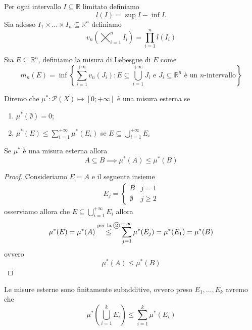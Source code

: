 \begin{definition}
	Per ogni intervallo $I \subseteq \mathbb{R}$ limitato definiamo
	$$
	\mathit{l}(I) = \sup{I} - \inf{I}.
	$$
	Sia adesso $I_1 \times \ldots \times I_n \subseteq \mathbb{R}^n$ definiamo
	$$
		v_n \left( \varprod_{i=1}^n I_i \right) = \prod_{i=1}^n \mathit{l}(I_i) 
	$$
\end{definition}
\begin{definition}
	Sia $E \subseteq \mathbb{R}^n$, definiamo la misura di Lebesgue di $E$ come
	\begin{equation}
		m_n(E) = \inf \left\{ \sum_{i=1}^{+\infty} v_n(J_i) : E \subseteq \bigcup_{i=1}^{+\infty} J_i \text{ e } J_i \subseteq \mathbb{R}^n \text{ è un } n\text{-intervallo} \right\}
		\label{eq:def_lebesgue}
	\end{equation}
\end{definition}
\begin{definition}
	Diremo che $\mu^*: \mathcal{P}(X) \mapsto [0; +\infty]$ è una misura esterna se
	\begin{enumerate}[label=\protect\circled{\arabic*}]
		\item $\mu^*(\emptyset) = 0$;
		\item $\mu^*(E) \leq \sum\limits_{i=1}^{+\infty} \mu^*(E_i)$ se $E \subseteq \bigcup\limits_{i=1}^{+\infty} E_i$
	\end{enumerate}
\end{definition}
\begin{prop}
	Se $\mu^*$ è una misura esterna allora
	$$
	A \subseteq B \implies \mu^*(A) \leq \mu^*(B)
	$$
	\label{prop:monotonia}
\end{prop}
\begin{proof}
	Consideriamo $E = A$ e il seguente insieme
	\begin{align*}
	E_j = \begin{cases} B & j=1 \\ \emptyset & j \geq 2	\end{cases}
	\end{align*}
	osserviamo allora che $E \subseteq \bigcup\limits_{i=1}^{+\infty} E_i$ allora
	$$
	\mu^*(E) = \mu^*(A) \stackrel{\text{per la \circled{2}}}{\leq} \sum_{j=1}^{+\infty} \mu^*(E_j) = \mu^*(E_1) = \mu^*(B)
	$$
	ovvero
	$$
	\mu^*(A) \leq \mu^*(B)
	$$
\end{proof}
\begin{prop}
	Le misure esterne sono finitamente subadditive, ovvero preso $E_1, \ldots, E_k$ avremo che 
	$$
	\mu^* \left( \bigcup_{i=1}^{k} E_i \right) \leq \sum_{i=1}^k \mu^*(E_i)
	$$
	\label{prop:sub_finita}
\end{prop}
